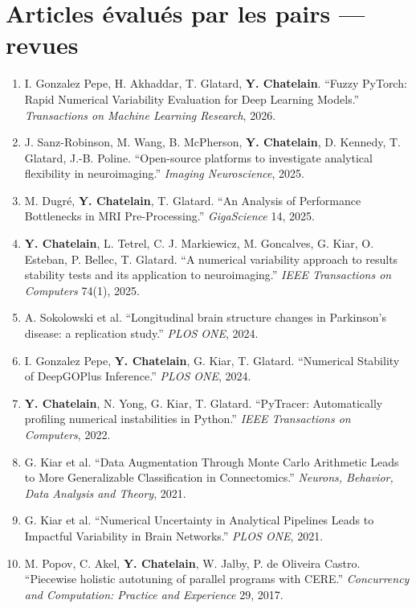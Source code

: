 \documentclass[10pt,letterpaper]{article}
\newcommand{\pub}[1]{\item #1}
\newcommand{\me}{\textbf{Y. Chatelain}}
\begin{document}
\section{Articles évalués par les pairs --- revues}
\begin{enumerate}[leftmargin=1.5em,label={\color{navy}\arabic*.},itemsep=2pt,topsep=1pt]
  \pub{I. Gonzalez Pepe, H. Akhaddar, T. Glatard, \me. ``Fuzzy PyTorch: Rapid Numerical Variability Evaluation for Deep Learning Models.'' \textit{Transactions on Machine Learning Research}, 2026.}
  \pub{J. Sanz-Robinson, M. Wang, B. McPherson, \me, D. Kennedy, T. Glatard, J.-B. Poline. ``Open-source platforms to investigate analytical flexibility in neuroimaging.'' \textit{Imaging Neuroscience}, 2025.}
  \pub{M. Dugré, \me, T. Glatard. ``An Analysis of Performance Bottlenecks in MRI Pre-Processing.'' \textit{GigaScience} 14, 2025.}
  \pub{\me, L. Tetrel, C. J. Markiewicz, M. Goncalves, G. Kiar, O. Esteban, P. Bellec, T. Glatard. ``A numerical variability approach to results stability tests and its application to neuroimaging.'' \textit{IEEE Transactions on Computers} 74(1), 2025.}
  \pub{A. Sokolowski et al. ``Longitudinal brain structure changes in Parkinson's disease: a replication study.'' \textit{PLOS ONE}, 2024.}
  \pub{I. Gonzalez Pepe, \me, G. Kiar, T. Glatard. ``Numerical Stability of DeepGOPlus Inference.'' \textit{PLOS ONE}, 2024.}
  \pub{\me, N. Yong, G. Kiar, T. Glatard. ``PyTracer: Automatically profiling numerical instabilities in Python.'' \textit{IEEE Transactions on Computers}, 2022.}
  \pub{G. Kiar et al. ``Data Augmentation Through Monte Carlo Arithmetic Leads to More Generalizable Classification in Connectomics.'' \textit{Neurons, Behavior, Data Analysis and Theory}, 2021.}
  \pub{G. Kiar et al. ``Numerical Uncertainty in Analytical Pipelines Leads to Impactful Variability in Brain Networks.'' \textit{PLOS ONE}, 2021.}
  \pub{M. Popov, C. Akel, \me, W. Jalby, P. de Oliveira Castro. ``Piecewise holistic autotuning of parallel programs with CERE.'' \textit{Concurrency and Computation: Practice and Experience} 29, 2017.}
\end{enumerate}

\newpage
\end{document}
